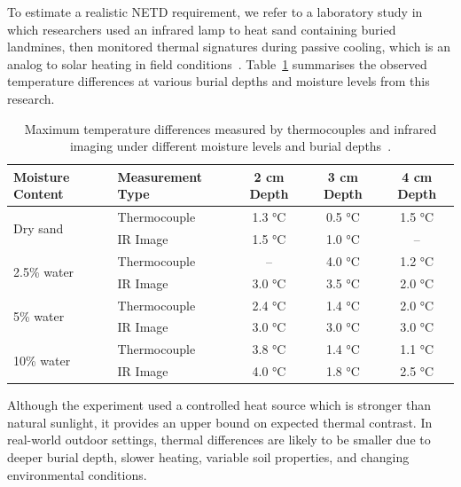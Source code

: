 To estimate a realistic \gls{NETD} requirement, we refer to a laboratory study in which researchers used an infrared lamp to heat sand containing buried landmines, then monitored thermal signatures during passive cooling, which is an analog to solar heating in field conditions~\cite{lamorski2002thermal}. Table~\ref{tab:netd_table} summarises the observed temperature differences at various burial depths and moisture levels from this research.


\begin{table}[htbp]
    \centering
    \footnotesize
    \renewcommand{\arraystretch}{1.1}
    \setlength{\tabcolsep}{6pt}
    \begin{tabular}{@{}llccc@{}}
        \toprule
        \textbf{Moisture Content} & \textbf{Measurement Type} & \textbf{2 cm Depth} & \textbf{3 cm Depth} & \textbf{4 cm Depth} \\
        \midrule
        \multirow{2}{*}{Dry sand} 
            & Thermocouple & 1.3 °C & 0.5 °C & 1.5 °C \\
            & IR Image     & 1.5 °C & 1.0 °C & -- \\
        \midrule
        \multirow{2}{*}{2.5\% water} 
            & Thermocouple & --     & 4.0 °C & 1.2 °C \\
            & IR Image     & 3.0 °C & 3.5 °C & 2.0 °C \\
        \midrule
        \multirow{2}{*}{5\% water} 
            & Thermocouple & 2.4 °C & 1.4 °C & 2.0 °C \\
            & IR Image     & 3.0 °C & 3.0 °C & 3.0 °C \\
        \midrule
        \multirow{2}{*}{10\% water} 
            & Thermocouple & 3.8 °C & 1.4 °C & 1.1 °C \\
            & IR Image     & 4.0 °C & 1.8 °C & 2.5 °C \\
        \bottomrule
    \end{tabular}
    \caption[Max temperature differences by depth and moisture]{Maximum temperature differences measured by thermocouples and infrared imaging under different moisture levels and burial depths~\cite{lamorski2002thermal}.}
    \label{tab:netd_table}
\end{table}



Although the experiment used a controlled heat source which is stronger than natural sunlight, it provides an upper bound on expected thermal contrast. In real-world outdoor settings, thermal differences are likely to be smaller due to deeper burial depth, slower heating, variable soil properties, and changing environmental conditions.


